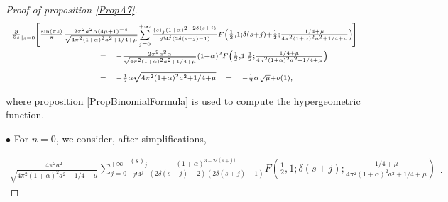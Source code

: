 \documentclass{jams-l}
\theoremstyle{definition}
\theoremstyle{remark}
\numberwithin{equation}{section}
\begin{document}
\begin{proof}[Proof of proposition \ref{PropA7}]
                    \[ \begin{array}{lllll}
                            \multicolumn{5}{l}{\scriptstyle \frac{\partial}{\partial s}_{\left \vert s = 0 \right.} \hspace{-2pt} \left[ \frac{\sin \left( \pi s \right)}{\pi} \frac{2 \pi^2 a^2 \alpha \left( 4 \mu + 1 \right)^{-s}}{\sqrt{4 \pi^2 \left( 1 + \alpha \right)^2 a^2 + 1/4 + \mu}} \hspace{-1pt} \sum\limits_{j=0}^{+\infty} \frac{\left( s \right)_j \left( 1 + \alpha \right)^{2 - 2 \delta \left( s + j \right)}}{j! 4^j \left( 2 \delta \left( s + j \right) - 1 \right)} F \left( \frac{1}{2}, 1; \delta \left( s + j \right) + \frac{1}{2}; \frac{1/4 + \mu}{4 \pi^2 \left( 1 + \alpha \right)^2 a^2 + 1/4 + \mu} \right) \hspace{-1pt} \right]} \\[1em]
                        
                            \qquad \qquad \qquad \qquad & \scriptstyle = & \multicolumn{3}{l}{\scriptstyle - \frac{2 \pi^2 a^2 \alpha}{\sqrt{4 \pi^2 \left( 1 + \alpha \right)^2 a^2 + 1/4 + \mu}} \left( 1 + \alpha \right)^2 F \left( \frac{1}{2}, 1; \frac{1}{2}; \frac{1/4 + \mu}{4 \pi^2 \left( 1 + \alpha \right)^2 a^2 + 1/4 + \mu} \right)} \\[1em]
                        
                            & \scriptstyle = & \scriptstyle - \frac{1}{2} \alpha \sqrt{4 \pi^2 \left( 1 + \alpha \right)^2 a^2 + 1/4 + \mu} & \scriptstyle = & \scriptstyle - \frac{1}{2} \alpha \sqrt{\mu} + o \left( 1 \right),
                        \end{array} \]
                    
                    \noindent where proposition \ref{PropBinomialFormula} is used to compute the hypergeometric function.
                
                    \medskip
                
                \hspace{10pt} $\bullet$ For $n = 0$, we consider, after simplifications,
                
                    \[ \begin{array}{l}
                            \scriptstyle \frac{4 \pi^2 a^2}{\sqrt{4 \pi^2 \left( 1 + \alpha \right)^2 a^2 + 1/4 + \mu}} \sum\limits_{j = 0}^{+ \infty} \frac{\left( s \right)_j}{j! 4^j} \frac{\left( 1 + \alpha \right)^{3 - 2 \delta \left( s + j \right)}}{\left( 2 \delta \left( s + j \right) - 2 \right) \left( 2 \delta \left( s + j \right) - 1 \right)} F \left( \frac{1}{2}, 1; \delta \left( s + j \right); \frac{1/4 + \mu}{4 \pi^2 \left( 1 + \alpha \right)^2 a^2 + 1/4 + \mu} \right)
                        \end{array} . \]
                    

\end{proof}
\end{document}
